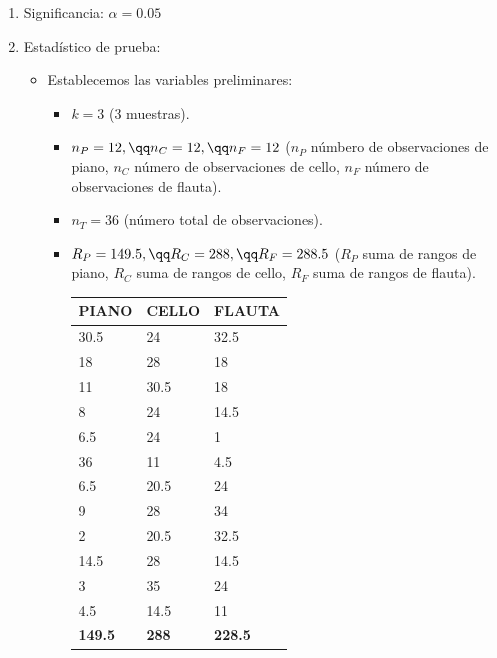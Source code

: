 \begin{enumerate}
    \item Significancia: $\alpha = 0.05$
    \item Estadístico de prueba: 
        \begin{itemize}
            \item Establecemos las variables preliminares:  
                \begin{itemize}
                    \item $k=3$ (3 muestras).
                    \item $n_P = 12, \qq n_C = 12, \qq n_F = 12$ ($n_P$ númbero de observaciones de piano, $n_C$ número de observaciones de cello, $n_F$ número de observaciones de flauta).
                    \item $n_T = 36$ (número total de observaciones).
                    \item $R_P = 149.5, \qq R_C = 288, \qq R_F = 288.5 $ ($R_P$ suma de rangos de piano, $R_C$ suma de rangos de cello, $R_F$ suma de rangos de flauta).
                        \begin{center}
                            \begin{tabular}{|lll|}
                                \hline
                                PIANO & CELLO & FLAUTA \\
                                \hline
                                30.5 & 24 & 32.5 \\
                                18 & 28 & 18 \\
                                11 & 30.5 & 18 \\
                                8 & 24 & 14.5 \\
                                6.5 & 24 & 1 \\
                                36 & 11 & 4.5 \\
                                6.5 & 20.5 & 24 \\
                                9 & 28 & 34 \\
                                2 & 20.5 & 32.5 \\
                                14.5 & 28 & 14.5 \\
                                3 & 35 & 24 \\
                                4.5 & 14.5 & 11 \\
                                \textbf{149.5} & \textbf{288} & \textbf{228.5} \\
                                \hline
                            \end{tabular}
                        \end{center}
                    

\end{itemize}
\end{itemize}
\end{enumerate}
